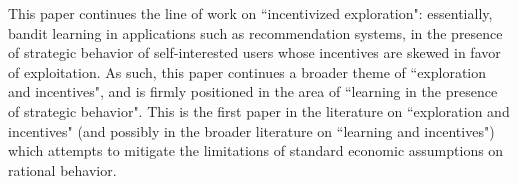 \documentclass[11pt,letterpaper]{article}
\begin{document}
\vspace{2mm}

This paper continues the line of work on ``incentivized exploration": essentially, bandit learning in applications such as recommendation systems, in the presence of strategic behavior of self-interested users whose incentives are skewed in favor of exploitation. As such, this paper continues a broader theme of ``exploration and incentives", and is firmly positioned in the area of ``learning in the presence of strategic behavior". This is the first paper in the literature on ``exploration and incentives" (and possibly in the broader literature on ``learning and incentives") which attempts to mitigate the limitations of standard economic assumptions on rational behavior.
\end{document}
